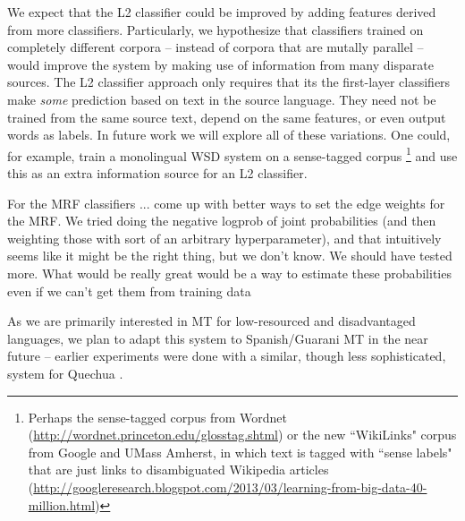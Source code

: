 \documentclass[11pt,letterpaper]{article}
\begin{document}
We expect that the L2 classifier could be improved by adding features derived
from more classifiers. Particularly, we hypothesize that classifiers trained on
completely different corpora -- instead of corpora that are mutally parallel --
would improve the system by making use of information from many disparate
sources. The L2 classifier approach only requires that its the first-layer
classifiers make \emph{some} prediction based on text in the source language.
They need not be trained from the same source text, depend on the same
features, or even output words as labels. In future work we will explore
all of these variations. One could, for example, train a monolingual WSD system
on a sense-tagged corpus \footnote{Perhaps the sense-tagged corpus from Wordnet
(\url{http://wordnet.princeton.edu/glosstag.shtml})
or the new ``WikiLinks" corpus from Google and UMass Amherst, in which text is
tagged with ``sense labels" that are just links to disambiguated Wikipedia
articles
(\url{http://googleresearch.blogspot.com/2013/03/learning-from-big-data-40-million.html})}
and use this as an extra information source for an L2 classifier.



For the MRF classifiers ...
come up with better ways to set the edge weights for the MRF. We tried doing
the negative logprob of joint probabilities (and then weighting those with
sort of an arbitrary hyperparameter), and that intuitively seems like it might
be the right thing, but we don't know. We should have tested more. What would
be really great would be a way to estimate these probabilities even if we
can't get them from training data

As we are primarily interested in MT for low-resourced and disadvantaged
languages, we plan to adapt this system to Spanish/Guarani MT in the near
future -- earlier experiments were done with a similar, though less
sophisticated, system for Quechua \cite{rudnick:2011:RANLPStud}.



{}
\end{document}
